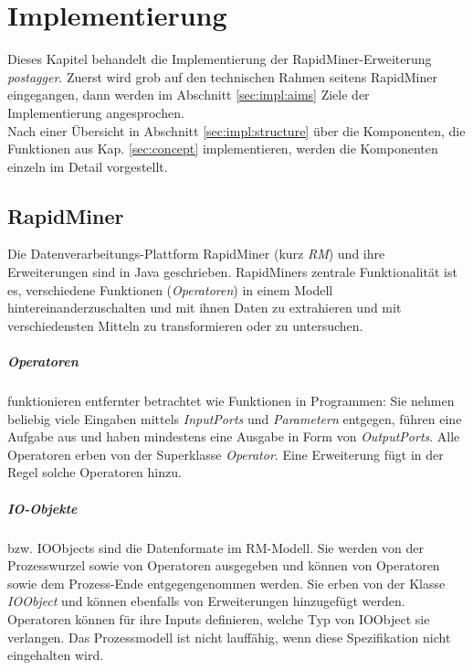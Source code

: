 %
\chapter{Implementierung}
\label{sec:impl}

Dieses Kapitel behandelt die Implementierung der RapidMiner-Erweiterung \textit{postagger}. Zuerst wird grob auf den technischen Rahmen seitens RapidMiner eingegangen, dann werden im Abschnitt \ref{sec:impl:aims} Ziele der Implementierung angesprochen. \\
Nach einer Übersicht in Abschnitt \ref{sec:impl:structure} über die Komponenten, die Funktionen aus Kap. \ref{sec:concept} implementieren, werden die Komponenten einzeln im Detail vorgestellt.

\section{RapidMiner}
\label{sec:impl:rm}


Die Datenverarbeitungs-Plattform RapidMiner (kurz \textit{RM}) und ihre Erweiterungen sind in Java geschrieben. RapidMiners zentrale Funktionalität ist es, verschiedene Funktionen (\textit{Operatoren}) in einem Modell hintereinanderzuschalten und mit ihnen Daten zu extrahieren und mit verschiedensten Mitteln zu transformieren oder zu untersuchen.

\paragraph{Operatoren} 
funktionieren entfernter betrachtet wie Funktionen in Programmen: Sie nehmen beliebig viele Eingaben mittels \textit{InputPorts} und \textit{Parametern} entgegen, führen eine Aufgabe aus und haben mindestens eine Ausgabe in Form von \textit{OutputPorts}. Alle Operatoren erben von der Superklasse \textit{Operator}. Eine Erweiterung fügt in der Regel solche Operatoren hinzu.
\paragraph{IO-Objekte}
bzw. IOObjects sind die Datenformate im RM-Modell. Sie werden von der Prozesswurzel sowie von Operatoren ausgegeben und können von Operatoren sowie dem Prozess-Ende entgegengenommen werden. Sie erben von der Klasse \textit{IOObject} und können ebenfalls von Erweiterungen hinzugefügt werden. Operatoren können für ihre Inputs definieren, welche Typ von IOObject sie verlangen. Das Prozessmodell ist nicht lauffähig, wenn diese Spezifikation nicht eingehalten wird.

